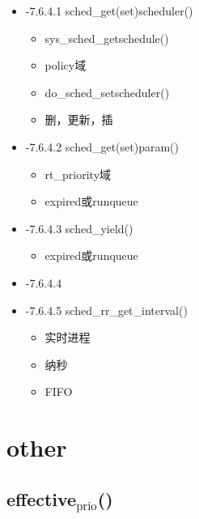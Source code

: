 \documentclass[11pt]{article}
\begin{document}
\begin{itemize}

\item -7.6.4.1 sched\_get(set)scheduler()\\
\label{sec-2.6.4.1}

\begin{itemize}
\item sys\_sched\_getschedule()
\item policy域
\item do\_sched\_setscheduler()
\item 删，更新，插
\end{itemize}

\item -7.6.4.2 sched\_get(set)param()\\
\label{sec-2.6.4.2}

\begin{itemize}
\item rt\_priority域
\item expired或runqueue
\end{itemize}

\item -7.6.4.3 sched\_yield()\\
\label{sec-2.6.4.3}

\begin{itemize}
\item expired或runqueue
\end{itemize}

\item -7.6.4.4\\
\label{sec-2.6.4.4}



\item -7.6.4.5 sched\_rr\_get\_interval()\\
\label{sec-2.6.4.5}

\begin{itemize}
\item 实时进程
\item 纳秒
\item FIFO
\end{itemize}
\end{itemize} %
\section{other}
\label{sec-3}

\subsection{effective$_{\mathrm{prio}}$()}
\label{sec-3.1}
\end{document}
